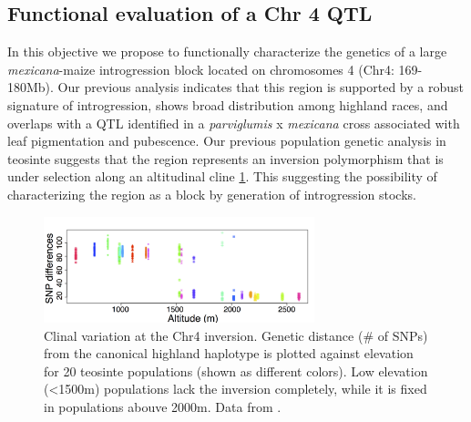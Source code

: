 \subsection{Functional evaluation of a Chr 4 QTL} \label{subsec:nils}

In this objective we propose to functionally characterize the genetics of a large \emph{mexicana}-maize introgression block located on chromosomes 4 (Chr4: 169-180Mb). Our previous analysis \citep{Hufford2013} indicates that this region is supported by a robust signature of introgression, shows broad distribution among highland races, and overlaps with a QTL identified in a \emph{parviglumis} x \emph{mexicana} cross  \citep{Lauter2004a} associated with leaf pigmentation and pubescence. Our previous population genetic analysis in teosinte \citep{Pyhajarvi2013}  suggests that the region represents an inversion polymorphism that is under selection along an altitudinal cline \ref{fig:cline}.  This suggesting the possibility of characterizing the region as a block by generation of introgression stocks.

\begin{figure}
  \centering
   \includegraphics[width=0.7\textwidth]{chr4.png}  \caption{Clinal variation at the Chr4 inversion. Genetic distance (\# of SNPs) from the canonical highland haplotype is plotted against elevation for 20 teosinte populations (shown as different colors).  Low elevation (<1500m) populations lack the inversion completely, while it is fixed in populations abouve 2000m. Data from \citet{Pyhajarvi2013}. } 
\label{fig:cline}
\end{figure}


